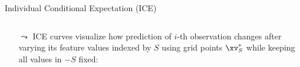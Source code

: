 \documentclass[11pt,compress,t,notes=noshow, aspectratio=169, xcolor=table]{beamer}
\begin{document}
\begin{frame}[c]{Individual Conditional Expectation (ICE) }
\begin{columns}[T]
\begin{column}{0.84\textwidth}
\bigskip

\begin{itemize}
    \item[$\leadsto$] ICE curves visualize how prediction of $i$-th observation changes after varying its feature values indexed by $S$ using grid points $\xv_S^*$ while keeping all values in $-S$ fixed:

\end{itemize}



\end{column}
\end{columns}



%
\end{frame}
\end{document}
